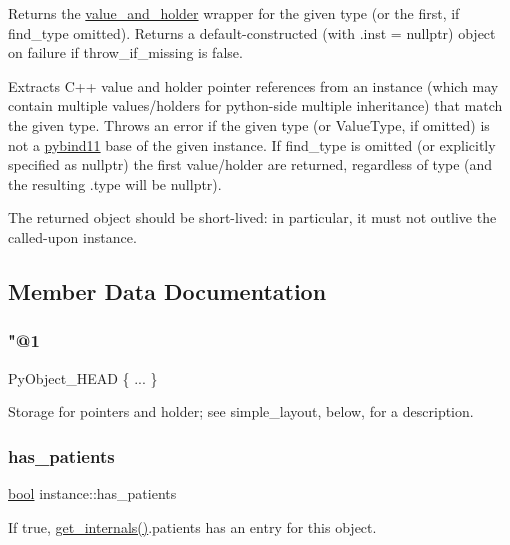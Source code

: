 Returns the \mbox{\hyperlink{structvalue__and__holder}{value\+\_\+and\+\_\+holder}} wrapper for the given type (or the first, if {\ttfamily find\+\_\+type} omitted). Returns a default-\/constructed (with {\ttfamily .inst = nullptr}) object on failure if {\ttfamily throw\+\_\+if\+\_\+missing} is false.

Extracts C++ value and holder pointer references from an instance (which may contain multiple values/holders for python-\/side multiple inheritance) that match the given type. Throws an error if the given type (or Value\+Type, if omitted) is not a \mbox{\hyperlink{namespacepybind11}{pybind11}} base of the given instance. If {\ttfamily find\+\_\+type} is omitted (or explicitly specified as nullptr) the first value/holder are returned, regardless of type (and the resulting .type will be nullptr).

The returned object should be short-\/lived\+: in particular, it must not outlive the called-\/upon instance. 

\subsection{Member Data Documentation}
\mbox{\label{structinstance_aafabccc03d3d2afd3ab7e1a1b01b7a56}} 
\subsubsection{\texorpdfstring{"@1}{@1}}
{\footnotesize\ttfamily Py\+Object\+\_\+\+H\+E\+AD \{ ... \} }



Storage for pointers and holder; see simple\+\_\+layout, below, for a description. 

\mbox{\label{structinstance_a30d2da1bf481e5628e3f20a84a4bcd1a}} 
\subsubsection{\texorpdfstring{has\_patients}{has\_patients}}
{\footnotesize\ttfamily \mbox{\hyperlink{asdl_8h_af6a258d8f3ee5206d682d799316314b1}{bool}} instance\+::has\+\_\+patients}



If true, \mbox{\hyperlink{internals_8h_a04a9d4c2d4a027e104437cce54c0cc5f}{get\+\_\+internals()}}.patients has an entry for this object. 

